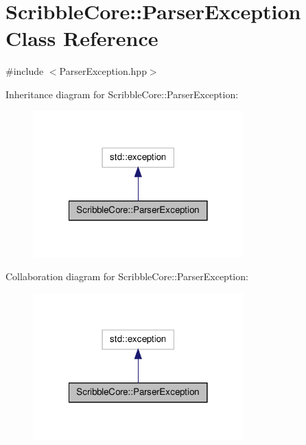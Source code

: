 \hypertarget{class_scribble_core_1_1_parser_exception}{\section{Scribble\-Core\-:\-:Parser\-Exception Class Reference}
\label{class_scribble_core_1_1_parser_exception}
}


{\ttfamily \#include $<$Parser\-Exception.\-hpp$>$}



Inheritance diagram for Scribble\-Core\-:\-:Parser\-Exception\-:
\nopagebreak
\begin{figure}[H]
\begin{center}
\leavevmode
\includegraphics[width=230pt]{class_scribble_core_1_1_parser_exception__inherit__graph}
\end{center}
\end{figure}


Collaboration diagram for Scribble\-Core\-:\-:Parser\-Exception\-:
\nopagebreak
\begin{figure}[H]
\begin{center}
\leavevmode
\includegraphics[width=230pt]{class_scribble_core_1_1_parser_exception__coll__graph}
\end{center}
\end{figure}
